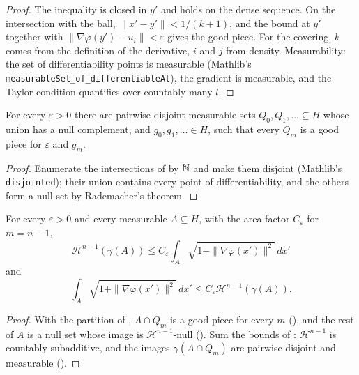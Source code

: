 \begin{proof}
\leanok
The inequality is closed in $y'$ and holds on the dense sequence. On the intersection with the
ball, $\|x' - y'\| < 1/(k+1)$, and the bound at $y'$ together with
$\|\nabla\varphi(y') - u_i\| < \varepsilon$ gives the good piece. For the covering, $k$ comes from
the definition of the derivative, $i$ and $j$ from density. Measurability: the set of
differentiability points is measurable (Mathlib's
\texttt{measurableSet\_\allowbreak of\_\allowbreak differentiableAt}), the gradient is measurable,
and the Taylor condition quantifies over countably many $l$.
\end{proof}

\begin{lemma}
\label{lem:good-partition}
\leanok
{}
For every $\varepsilon > 0$ there are pairwise disjoint measurable sets $Q_0, Q_1, \ldots
\subseteq H$ whose union has a null complement, and $g_0, g_1, \ldots \in H$, such that every
$Q_m$ is a good piece for $\varepsilon$ and $g_m$.
\end{lemma}

\begin{proof}
\leanok
Enumerate the intersections of  by $\mathbb{N}$ and make them disjoint (Mathlib's
\texttt{disjointed}); their union contains every point of differentiability, and the others form
a null set by Rademacher's theorem.
\end{proof}

\begin{lemma}
\label{lem:area-fixed-accuracy}
\leanok
{}
For every $\varepsilon > 0$ and every measurable $A \subseteq H$, with the area factor
$C_\varepsilon$ for $m = n - 1$,
\[
  \mathcal H^{n-1}(\gamma(A)) \leq C_\varepsilon \int_A \sqrt{1 + \|\nabla\varphi(x')\|^2} \, dx'
\]
and
\[
  \int_A \sqrt{1 + \|\nabla\varphi(x')\|^2} \, dx' \leq C_\varepsilon \mathcal H^{n-1}(\gamma(A)).
\]
\end{lemma}

\begin{proof}
\leanok
With the partition of , $A \cap Q_m$ is a good piece for every $m$
(), and the rest of $A$ is a null set whose image is
$\mathcal H^{n-1}$-null (). Sum the bounds of :
$\mathcal H^{n-1}$ is countably subadditive, and the images $\gamma(A \cap Q_m)$ are pairwise
disjoint and measurable ().
\end{proof}


